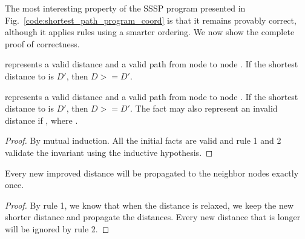 The most interesting property of the SSSP program presented in
Fig.~\ref{code:shortest_path_program_coord} is that it remains provably correct,
although it applies rules using a smarter ordering. We now show the complete
proof of correctness.

\begin{invariant}[Distance]

 represents a valid distance  and a valid path
 from node  to node . If the shortest distance to
 is $D'$, then $D >= D'$.

 represents a valid distance  and a valid
path  from node  to node . If the shortest
distance to  is $D'$, then $D >= D'$. The  fact may
also represent an invalid distance if , where .

\end{invariant}

\begin{proof}
By mutual induction. All the initial facts are valid and rule 1 and 2 validate the
invariant using the inductive hypothesis.
\end{proof}

\begin{lemma}[Relaxation]
Every new improved distance will be propagated to the neighbor nodes exactly once.
\end{lemma}
\begin{proof}
By rule 1, we know that when the distance is relaxed, we keep the new shorter
distance and propagate the distances. Every new distance that is longer will be
ignored by rule 2.
\end{proof}

